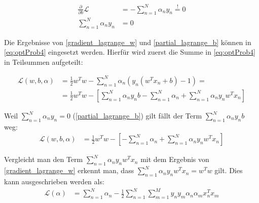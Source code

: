 \documentclass[a4paper,11pt,twoside]{scrreprt}
\newcommand{\Lagr}{\mathcal{L}}
\begin{document}
\begin{equation} \label{partial_lagrange_b}
	\begin{aligned}
		\frac{\partial}{\partial b} \Lagr &= - \sum_{n=1}^{N} \alpha_{n} y_{n} \overset{!}{=} 0 \\
		\sum_{n=1}^{N} \alpha_{n} y_{n} &= 0
	\end{aligned}
\end{equation}

Die Ergebnisse von \autoref{gradient_lagrange_w} und \autoref{partial_lagrange_b} können in \autoref{eq:optProb4} eingesetzt werden. Hierfür wird zuerst die Summe in \autoref{eq:optProb4} in Teilsummen aufgeteilt:

\begin{equation} \label{lagrange_substituted}
	\begin{aligned}
		\Lagr(w, b, \alpha) &= \frac{1}{2} w^{T} w - \sum_{n=1}^{N} \alpha_{n} (y_n (w^{T} x_{n} + b)-1) = \\
		&= \frac{1}{2} w^{T} w - [\sum_{n=1}^{N} \alpha_{n} y_{n} b - \sum_{n=1}^{N} \alpha_{n} + \sum_{n=1}^{N} \alpha_{n} y_{n} w^{T} x_{n}]
	\end{aligned}
\end{equation}

Weil $\sum_{n=1}^{N} \alpha_{n} y_{n} = 0$ (\autoref{partial_lagrange_b}) gilt fällt der Term $\sum_{n=1}^{N} \alpha_{n} y_{n} b$ weg:
\begin{equation} \label{lagrange_substituted2}
	\begin{aligned}
		\Lagr(w, b, \alpha) &= \frac{1}{2} w^{T} w - [-\sum_{n=1}^{N} \alpha_{n} + \sum_{n=1}^{N} \alpha_{n} y_{n} w^{T} x_{n}]
	\end{aligned}
\end{equation}

Vergleicht man den Term $\sum_{n=1}^{N} \alpha_{n} y_{n} w^{T} x_{n}$ mit dem Ergebnis von \autoref{gradient_lagrange_w} erkennt man, dass $\sum_{n=1}^{N} \alpha_{n} y_{n} w^{T} x_{n} = w^T w$ gilt. Dies kann ausgeschrieben werden als:
\begin{equation} \label{lagrange_substituted3}
	\begin{aligned}
		\Lagr(\alpha) &= \sum_{n=1}^{N }\alpha_{n} - \frac{1}{2} \sum_{n=1}^{N} \sum_{m=1}^{M} y_{n} y_{m} \alpha_{n} \alpha_{m} x_{n}^{T} x_{m}
	\end{aligned}
\end{equation}
\end{document}
